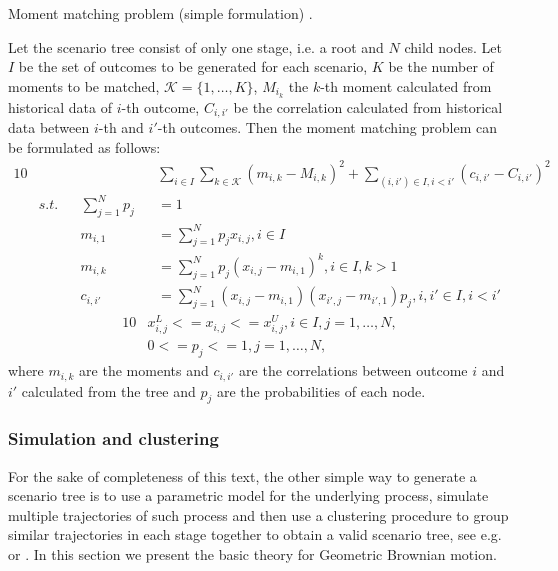 \begin{defn}{Moment matching problem (simple formulation) \cite[p. 9]{moment_matching_agarwal}.}

Let the scenario tree consist of only one stage, i.e. a root and $N$ child nodes. Let $I$ be the set of outcomes to be generated for each scenario, $K$ be the number of moments to be matched, $\mathcal{K}=\{1,\dots,K\}$, $M_{i_k}$ the $k$-th moment calculated from historical data of $i$-th outcome, $C_{i,i'}$ be the correlation calculated from historical data between $i$-th and $i'$-th outcomes. Then the moment matching problem can be formulated as follows:
\begin{alignat}{10}
& && && \sum_{i\in I} \sum_{k\in \mathcal{K}} \left(m_{i,k} - M_{i,k}\right)^2 + \sum_{(i, i') \in I, i < i'}(c_{i,i'}-C_{i,i'})^2 \nonumber \\
& s.t. && \sum_{j=1}^N p_j&&=1 \nonumber \\
& && m_{i,1}&&=\sum_{j=1}^N p_jx_{i,j}, i \in I \nonumber \\
& && m_{i,k}&&=\sum_{j=1}^N p_j(x_{i,j}-m_{i,1})^k, i \in I, k>1 \nonumber \\
& && c_{i,i'}&&=\sum_{j=1}^N(x_{i,j}-m_{i,1})(x_{i',j}-m_{i',1})p_j, i,i' \in I, i<i' \nonumber
\end{alignat}
\vspace{-0.5cm}
\begin{alignat}{10}
& x_{i,j}^L<=x_{i,j}<=x_{i,j}^U, i \in I, j=1,\dots,N, \nonumber \\
& 0 <= p_j <= 1, j=1,\dots,N, \nonumber
\end{alignat}
where $m_{i,k}$ are the moments and $c_{i,i'}$ are the correlations between outcome $i$ and $i'$ calculated from the tree and $p_j$ are the probabilities of each node.
\end{defn}


\subsubsection{Simulation and clustering}
For the sake of completeness of this text, the other simple way to generate a scenario tree is to use a parametric model for the underlying process, simulate multiple trajectories of such process and then use a clustering procedure to group similar trajectories in each stage together to obtain a valid scenario tree, see e.g. \cite[Section 3]{dupacova_scenarios_for_multistage_stochastic_programs} or \cite[Section 3]{kmeans_clustering}. In this section we present the basic theory for Geometric Brownian motion.

